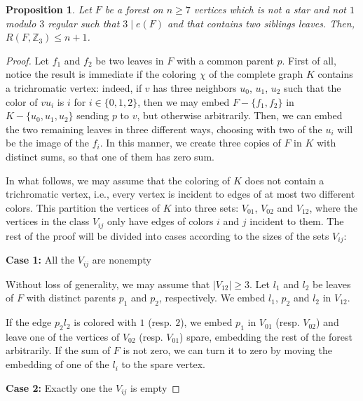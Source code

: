 \documentclass[10pt,a4paper]{amsart}
\newtheorem{proposition}{Proposition}
\begin{document}
\begin{proposition}\label{prop:siblings-upper}
    Let $F$ be a forest on $n \geq 7$ vertices which is not a star and not $1$ modulo $3$ regular such that $3 \mid e(F)$ and that contains two siblings leaves. Then, $R(F,\mathbb{Z}_3) \leq n+1$. 
\end{proposition}

\begin{proof}
    Let $f_1$ and $f_2$ be two leaves in $F$ with a common parent $p$.
    First of all, notice the result is immediate if the coloring $\chi$ of the complete graph $K$ contains a trichromatic vertex: indeed, if $v$ has three neighbors $u_0$, $u_1$, $u_2$ such that the color of $vu_i$ is $i$ for $i \in \{0,1,2\}$, then we may embed $F-\{f_1,f_2\}$ in $K-\{u_0,u_1,u_2\}$ sending $p$ to $v$, but otherwise arbitrarily. Then, we can embed the two remaining leaves in three different ways, choosing with two of the $u_i$ will be the image of the $f_i$. In this manner, we create three copies of $F$ in $K$ with distinct sums, so that one of them has zero sum.

    In what follows, we may assume that the coloring of $K$ does not contain a trichromatic vertex, i.e., every vertex is incident to edges of at most two different colors. This partition the vertices of $K$ into three sets: $V_{01}$, $V_{02}$ and $V_{12}$, where the vertices in the class $V_{ij}$ only have edges of colors $i$ and $j$ incident to them. The rest of the proof will be divided into cases according to the sizes of the sets $V_{ij}$:

    \textbf{Case 1:} All the $V_{ij}$ are nonempty

    \medskip
    
    Without loss of generality, we may assume that $|V_{12}| \geq 3$. Let $l_1$ and $l_2$ be leaves of $F$ with distinct parents $p_1$ and $p_2$, respectively. We embed $l_1$, $p_2$ and $l_2$ in $V_{12}$.

    If the edge $p_2l_2$ is colored with $1$ (resp. $2$), we embed $p_1$ in $V_{01}$ (resp. $V_{02}$) and leave one of the vertices of $V_{02}$ (resp. $V_{01}$) spare, embedding the rest of the forest arbitrarily. If the sum of $F$ is not zero, we can turn it to zero by moving the embedding of one of the $l_i$ to the spare vertex.

    \textbf{Case 2:} Exactly one the $V_{ij}$ is empty


\end{proof}
\end{document}
